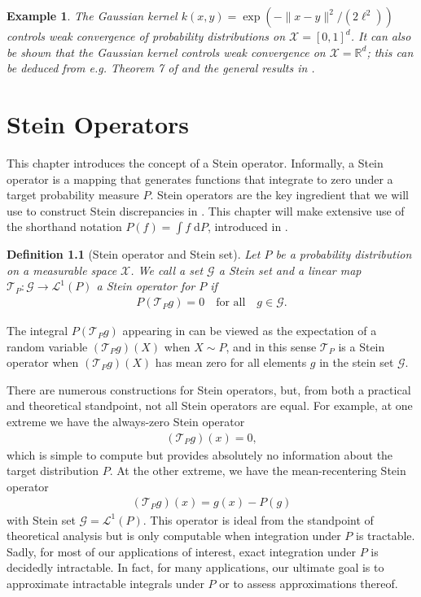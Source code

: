 \documentclass[12pt,paper=letter]{scrreprt}
\newtheorem{definition}{Definition}[chapter]
\newtheorem{example}{Example}[chapter]
\newcommand{\qtext}[1]{\quad\text{#1}\quad}
\newcommand{\xset}[0]{\mathcal{X}} %
\newcommand{\gset}[0]{\mathcal{G}} %
\newcommand{\TP}{\mathcal{T}_P}
\newcommand{\Lp}[1][p]{\mathcal{L}^{#1}}
\begin{document}
\begin{example}
The Gaussian kernel $k(x,y) = \exp(-\|x-y\|^2 / (2\ell^2))$ controls weak convergence of probability distributions on $\mathcal{X} = [0,1]^d$.
It can also be shown that the Gaussian kernel controls weak convergence on $\mathcal{X} = \mathbb{R}^d$; this can be deduced from e.g. Theorem 7 of \citet{simon2020metrizing} and the general results in \citet{sriperumbudur2011universality}.
\end{example}




\chapter{Stein Operators}
\label{chap: Stein operators}


This chapter introduces the concept of a Stein operator.
Informally, a Stein operator is a mapping that generates functions that integrate to zero under a target probability measure $P$.
Stein operators are the key ingredient that we will use to construct Stein discrepancies in .
This chapter will make extensive use of the shorthand notation $P(f) = \int f \; \mathrm{d}P$, introduced in .

\begin{definition}[Stein operator and Stein set]
    \label{def: stein op}
    Let $P$ be a probability distribution on a measurable space $\xset$.
    We call a set $\gset$ a \emph{Stein set} and a linear map $\TP : \gset \rightarrow \Lp[1](P)$ a \emph{Stein operator} for $P$ if 
    \begin{align}
    P(\TP g) = 0
    \qtext{for all}
    g \in \gset.
    \end{align}
\end{definition}

\noindent The integral $P(\TP g)$ appearing in  can be viewed as the expectation of a random variable $(\TP g)(X)$ when $X \sim P$, and in this sense $\TP$ is a Stein operator when $(\TP g)(X)$ has mean zero for all elements $g$ in the stein set $\gset$.

There are numerous constructions for Stein operators, but, from both a practical and theoretical standpoint, 
not all Stein operators are equal.
For example, at one extreme we have the always-zero Stein operator 
\begin{align}
(\TP g)(x) = 0,
\end{align}
which is simple to compute but provides absolutely no information about the target distribution $P$. 
At the other extreme, we have the mean-recentering Stein operator
\begin{align}
    (\TP g)(x) = g(x) - P(g) \label{eq: triv SO}
\end{align}
with Stein set $\gset = \Lp[1](P)$.
This operator is ideal from the standpoint of theoretical analysis but is only computable when integration under $P$ is tractable. %
Sadly, for most of our applications of interest, exact integration under $P$ is decidedly intractable.
In fact, for many applications, our ultimate goal is to approximate intractable integrals under $P$ or to assess approximations thereof.
\end{document}
